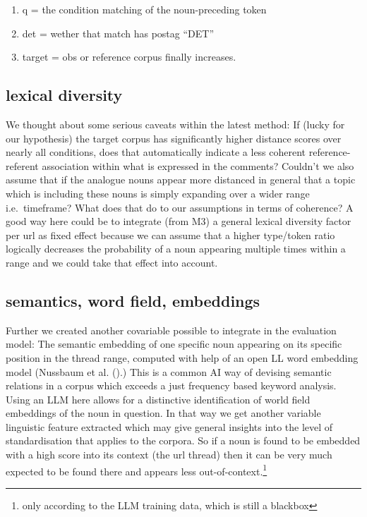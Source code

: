 \documentclass[
  12pt,
  oneside]{book}
\providecommand{\tightlist}{%
  \setlength{\itemsep}{0pt}\setlength{\parskip}{0pt}}
\begin{document}
\begin{enumerate}
\def\labelenumi{\arabic{enumi}.}
\tightlist
\item
  q = the condition matching of the noun-preceding token
\item
  det = wether that match has postag ``DET''
\item
  target = obs or reference corpus
  finally increases.
\end{enumerate}

\subsection{lexical diversity}\label{lexical-diversity}

We thought about some serious caveats within the latest method: If (lucky for our hypothesis) the target corpus has significantly higher distance scores over nearly all conditions, does that automatically indicate a less coherent reference-referent association within what is expressed in the comments? Couldn't we also assume that if the analogue nouns appear more distanced in general that a topic which is including these nouns is simply expanding over a wider range i.e.~timeframe? What does that do to our assumptions in terms of coherence? A good way here could be to integrate (from M3) a general lexical diversity factor per url as fixed effect because we can assume that a higher type/token ratio logically decreases the probability of a noun appearing multiple times within a range and we could take that effect into account.

\subsection{semantics, word field, embeddings}\label{semantics-word-field-embeddings}

Further we created another covariable possible to integrate in the evaluation model: The semantic embedding of one specific noun appearing on its specific position in the thread range, computed with help of an open LL word embedding model (Nussbaum et al. ().) This is a common AI way of devising semantic relations in a corpus which exceeds a just frequency based keyword analysis. Using an LLM here allows for a distinctive identification of world field embeddings of the noun in question. In that way we get another variable linguistic feature extracted which may give general insights into the level of standardisation that applies to the corpora. So if a noun is found to be embedded with a high score into its context (the url thread) then it can be very much expected to be found there and appears less out-of-context.\footnote{only according to the LLM training data, which is still a blackbox}
\end{document}
